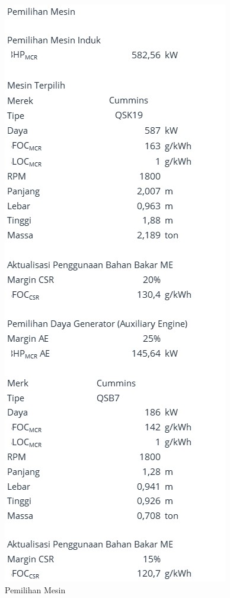 \begin{figure}[!ht]
    \centering
    \includegraphics[width=\linewidth,height=\textheight,keepaspectratio]{lampiran/deskap-4.jpg}
    \caption*{Pemilihan Mesin}
\end{figure}


